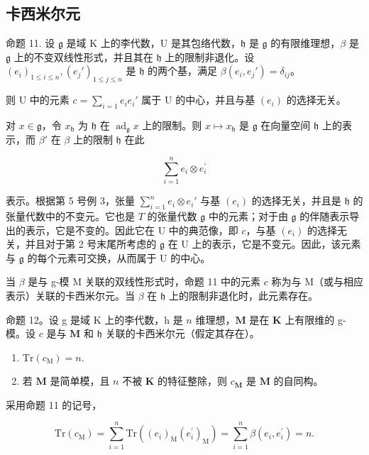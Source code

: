\subsection{卡西米尔元}

命题 11. 设 \(\mathfrak{g}\) 是域 K 上的李代数，U 是其包络代数，\(\mathfrak{h}\) 是 \(\mathfrak{g}\) 的有限维理想，\(\beta\) 是 \(\mathfrak{g}\) 上的不变双线性形式，并且其在 \(\mathfrak{h}\) 上的限制非退化。设 \((e_i)_{1\leqslant i\leqslant n}, (e_j')_{1\leqslant j\leqslant n}\) 是 \(\mathfrak{h}\) 的两个基，满足 \(\beta(e_i,e_j') = \delta_{ij}\)。

则 U 中的元素 \(c = \sum_{i=1} e_i e_i'\) 属于 U 的中心，并且与基 \((e_i)\) 的选择无关。

对 \(x \in \mathfrak{g}\)，令 \(x_{\mathfrak{h}}\) 为 \(\mathfrak{h}\) 在 \(\operatorname{ad}_{\mathfrak{g}} x\) 上的限制。则 \(x \mapsto x_{\mathfrak{h}}\) 是 \(\mathfrak{g}\) 在向量空间 \(\mathfrak{h}\) 上的表示，而 \(\beta'\) 在 \(\beta\) 上的限制 \(\mathfrak{h}\) 在此

\[
\sum_ {i = 1} ^ {n} e _ {i} \otimes e _ {i} ^ {\prime}
\]

 表示。根据第 5 号例 3，张量 \(\sum_{i=1}^{n} e_i \otimes e_i'\) 与基 \((e_i)\) 的选择无关，并且是 \(\mathfrak{h}\) 的张量代数中的不变元。它也是 \(T\) 的张量代数 \(\mathfrak{g}\) 中的元素；对于由 \(\mathfrak{g}\) 的伴随表示导出的表示，它是不变的。因此它在 U 中的典范像，即 \(c\)，与基 \((e_i)\) 的选择无关，并且对于第 2 号末尾所考虑的 \(\mathfrak{g}\) 在 U 上的表示，它是不变元。因此，该元素与 \(\mathfrak{g}\) 的每个元素可交换，从而属于 U 的中心。

当 \(\beta\) 是与 g-模 M 关联的双线性形式时，命题 11 中的元素 \(c\) 称为与 M（或与相应表示）关联的卡西米尔元。当 \(\beta\) 在 \(\mathfrak{h}\) 上的限制非退化时，此元素存在。

命题 12。设 g 是域 K 上的李代数，h 是 \(n\) 维理想，\(\mathbf{M}\) 是在 \(\mathbf{K}\) 上有限维的 g-模。设 \(c\) 是与 \(\mathbf{M}\) 和 \(\mathfrak{h}\) 关联的卡西米尔元（假定其存在）。

\begin{enumerate}
\def\labelenumi{(\alph{enumi})}
\item
  \(\mathrm{Tr}(c_{\mathrm{M}})=n.\)
\item
  若 \(\mathbf{M}\) 是简单模，且 \(n\) 不被 \(\mathbf{K}\) 的特征整除，则 \(c_{\mathbf{M}}\) 是 \(\mathbf{M}\) 的自同构。
\end{enumerate}

采用命题 11 的记号，

\[
\mathrm{Tr} (c _ {\mathrm{M}}) = \sum_ {i = 1} ^ {n} \mathrm{Tr} ((e _ {i}) _ {\mathrm{M}} (e _ {i} ^ {\prime}) _ {\mathrm{M}}) = \sum_ {i = 1} ^ {n} \beta (e _ {i}, e _ {i} ^ {\prime}) = n.
\]


